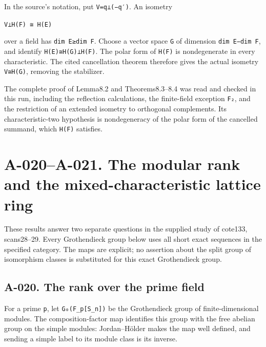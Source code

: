 \documentclass[
  10pt,
]{article}
\begin{document}
In the source's notation, put
\texttt{\small V=\allowbreak{}q⊥(\allowbreak{}−q′)\allowbreak{}}. An
isometry

\texttt{\small V⊥H(\allowbreak{}F)\allowbreak{} ≅ H(\allowbreak{}E)\allowbreak{}}

over a field has \texttt{\small dim E≥\allowbreak{}dim F}. Choose a
vector space \texttt{\small G} of dimension \texttt{\small dim E−dim F},
and identify
\texttt{\small H(\allowbreak{}E)\allowbreak{}≅H(\allowbreak{}G)\allowbreak{}⊥H(\allowbreak{}F)\allowbreak{}}.
The polar form of \texttt{\small H(\allowbreak{}F)\allowbreak{}} is
nondegenerate in every characteristic. The cited cancellation theorem
therefore gives the actual isometry
\texttt{\small V≅H(\allowbreak{}G)\allowbreak{}}, removing the
stabilizer.

The complete proof of Lemma8.2 and Theorems8.3--8.4 was read and checked
in this run, including the reflection calculations, the finite-field
exception \texttt{\small F₂}, and the restriction of an extended
isometry to orthogonal complements. Its characteristic-two hypothesis is
nondegeneracy of the polar form of the cancelled summand, which
\texttt{\small H(\allowbreak{}F)\allowbreak{}} satisfies.

\section{A-020--A-021. The modular rank and the mixed-characteristic
lattice
ring}\label{a-020a-021.-the-modular-rank-and-the-mixed-characteristic-lattice-ring}

These results answer two separate questions in the supplied study of
cote133, scans28--29. Every Grothendieck group below uses all short
exact sequences in the specified category. The maps are explicit; no
assertion about the split group of isomorphism classes is substituted
for this exact Grothendieck group.

\subsection{A-020. The rank over the prime
field}\label{a-020.-the-rank-over-the-prime-field}

For a prime \texttt{\small p}, let
\texttt{\small G₀(\allowbreak{}F\_\allowbreak{}p[\allowbreak{}S\_\allowbreak{}n]\allowbreak{})\allowbreak{}}
be the Grothendieck group of finite-dimensional modules. The
composition-factor map identifies this group with the free abelian group
on the simple modules: Jordan--Hölder makes the map well defined, and
sending a simple label to its module class is its inverse.
\end{document}
